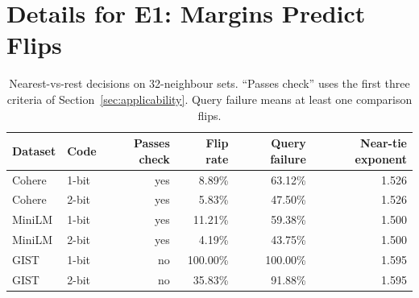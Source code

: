 \section{Details for E1: Margins Predict Flips}
\label{app:ranking}

\begin{table}[tbp]
\centering


\small
\begin{tabular}{llrrrr}
\toprule
Dataset & Code & Passes check & Flip rate & Query failure & Near-tie exponent \\
\midrule
Cohere & 1-bit & yes & 8.89\% & 63.12\% & 1.526 \\
Cohere & 2-bit & yes & 5.83\% & 47.50\% & 1.526 \\
MiniLM & 1-bit & yes & 11.21\% & 59.38\% & 1.500 \\
MiniLM & 2-bit & yes & 4.19\% & 43.75\% & 1.500 \\
GIST & 1-bit & no & 100.00\% & 100.00\% & 1.595 \\
GIST & 2-bit & no & 35.83\% & 91.88\% & 1.595 \\
\bottomrule
\end{tabular}

\small
\caption{Nearest-vs-rest decisions on 32-neighbour sets. ``Passes check'' uses the first three criteria of Section~\ref{sec:applicability}. Query failure means at least one comparison flips.}
\label{tab:app-probe24}
\end{table}


